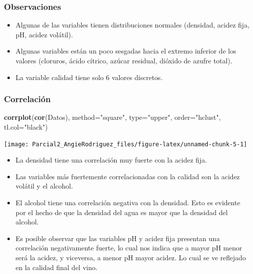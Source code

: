 \documentclass[
]{article}
\newenvironment{Shaded}{\begin{snugshade}}{\end{snugshade}}
\newcommand{\DataTypeTok}[1]{\textcolor[rgb]{0.13,0.29,0.53}{#1}}
\newcommand{\KeywordTok}[1]{\textcolor[rgb]{0.13,0.29,0.53}{\textbf{#1}}}
\newcommand{\NormalTok}[1]{#1}
\newcommand{\StringTok}[1]{\textcolor[rgb]{0.31,0.60,0.02}{#1}}
\begin{document}
\hypertarget{observaciones}{%
\subsubsection{Observaciones}\label{observaciones}}

\begin{itemize}
\item
  Algunas de las variables tienen distribuciones normales (densidad,
  acidez fija, pH, acidez volátil).
\item
  Algunas variables están un poco sesgadas hacia el extremo inferior de
  los valores (cloruros, ácido cítrico, azúcar residual, dióxido de
  azufre total).
\item
  La variable calidad tiene solo 6 valores discretos.
\end{itemize}

\hypertarget{correlaciuxf3n}{%
\subsubsection{Correlación}\label{correlaciuxf3n}}

\begin{Shaded}
\begin{Highlighting}[]
\KeywordTok{corrplot}\NormalTok{(}\KeywordTok{cor}\NormalTok{(Datos), }\DataTypeTok{method=}\StringTok{"square"}\NormalTok{, }\DataTypeTok{type=}\StringTok{"upper"}\NormalTok{, }\DataTypeTok{order=}\StringTok{"hclust"}\NormalTok{, }\DataTypeTok{tl.col=}\StringTok{"black"}\NormalTok{)}
\end{Highlighting}
\end{Shaded}

\begin{center}\texttt{[image: Parcial2\_AngieRodriguez\_files/figure-latex/unnamed-chunk-5-1]} \end{center}

\begin{itemize}
\item
  La densidad tiene una correlación muy fuerte con la acidez fija.
\item
  Las variables más fuertemente correlacionadas con la calidad son la
  acidez volátil y el alcohol.
\item
  El alcohol tiene una correlación negativa con la densidad. Esto es
  evidente por el hecho de que la densidad del agua es mayor que la
  densidad del alcohol.
\item
  Es posible observar que las variables pH y acidez fija presentan una
  correlación negativamente fuerte, lo cual nos indica que a mayor pH
  menor será la acidez, y viceversa, a menor pH mayor acidez. Lo cual se
  ve reflejado en la calidad final del vino.
\end{itemize}
\end{document}
